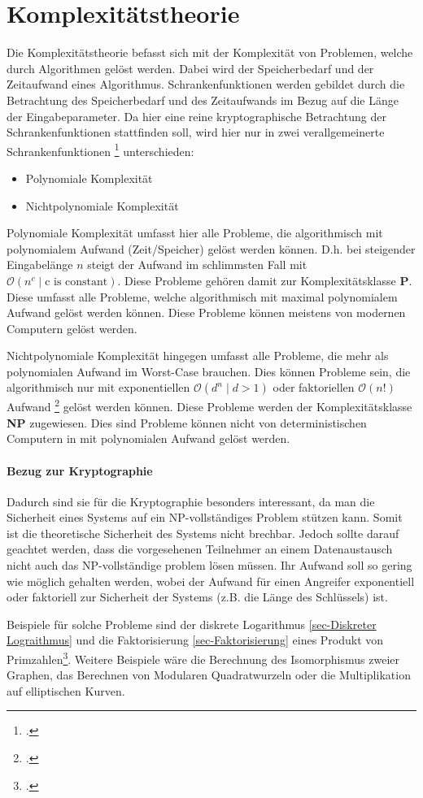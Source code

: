 \section{Komplexitätstheorie}
    Die Komplexitätstheorie befasst sich mit der Komplexität von Problemen, welche durch Algorithmen gelöst werden. Dabei wird der Speicherbedarf und der Zeitaufwand eines Algorithmus. Schrankenfunktionen werden gebildet durch die Betrachtung des Speicherbedarf und des Zeitaufwands im Bezug auf die Länge der Eingabeparameter. Da hier eine reine kryptographische Betrachtung der Schrankenfunktionen stattfinden soll, wird hier nur in zwei verallgemeinerte Schrankenfunktionen \footcite[178]{BSW.2015} unterschieden:
    \begin{itemize}
        \item Polynomiale Komplexität
        \item Nichtpolynomiale Komplexität
    \end{itemize}
    Polynomiale Komplexität umfasst hier alle Probleme, die algorithmisch mit polynomialem Aufwand (Zeit/Speicher) gelöst werden können. D.h. bei steigender Eingabelänge $n$ steigt der Aufwand im schlimmsten Fall mit $\mathcal{O}(n^{c} \mid \text{c is constant})$.
    Diese Probleme gehören damit zur Komplexitätsklasse \textbf{P}. Diese umfasst alle Probleme, welche algorithmisch mit maximal polynomialem Aufwand gelöst werden können. Diese Probleme können meistens von modernen Computern gelöst werden.

    Nichtpolynomiale Komplexität hingegen umfasst alle Probleme, die mehr als polynomialen Aufwand im Worst-Case brauchen. Dies können Probleme sein, die algorithmisch nur mit exponentiellen $\mathcal{O}(d^{n} \mid d > 1)$ oder faktoriellen $\mathcal{O}(n!)$ Aufwand \footcite{wiki.komplex} gelöst werden können. 
    Diese Probleme werden der Komplexitätsklasse \textbf{NP} zugewiesen. Dies sind Probleme können nicht von deterministischen Computern in mit polynomialen Aufwand gelöst werden. 
    
    \paragraph{Bezug zur Kryptographie} Dadurch sind sie für die Kryptographie besonders interessant, da man die Sicherheit eines Systems auf ein NP-vollständiges Problem stützen kann. Somit ist die theoretische Sicherheit des Systems nicht brechbar. Jedoch sollte darauf geachtet werden, dass die vorgesehenen Teilnehmer an einem Datenaustausch nicht auch das NP-vollständige problem lösen müssen. Ihr Aufwand soll so gering wie möglich gehalten werden, wobei der Aufwand für einen Angreifer exponentiell oder faktoriell zur Sicherheit der Systems (z.B. die Länge des Schlüssels) ist. 

    Beispiele für solche Probleme sind der diskrete Logarithmus \ref{sec-Diskreter Lograithmus} und die Faktorisierung \ref{sec-Faktorisierung} eines Produkt von Primzahlen\footcite[179]{BSW.2015}. Weitere Beispiele wäre die Berechnung des Isomorphismus zweier Graphen, das Berechnen von Modularen Quadratwurzeln oder die Multiplikation auf elliptischen Kurven.



